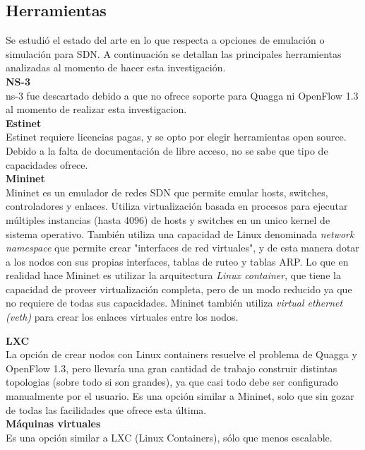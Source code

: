 \documentclass[a4paper,12pt]{report}
\begin{document}
\subsection{Herramientas}
Se estudió el estado del arte en lo que respecta a opciones de emulación o simulación para SDN. A continuación se detallan las principales herramientas analizadas al momento de hacer esta investigación.\\

\textbf{NS-3}\\
ns-3 fue descartado debido a que no ofrece soporte para Quagga ni OpenFlow 1.3 al momento de realizar esta investigacion.\\

\textbf{Estinet}\\
Estinet requiere licencias pagas, y se opto por elegir herramientas open source. Debido a la falta de documentación de libre acceso, no se sabe que tipo de capacidades ofrece.\\

\textbf{Mininet}\\
Mininet es un emulador de redes SDN que permite emular hosts, switches, controladores y enlaces. Utiliza virtualización basada en procesos para ejecutar múltiples instancias (hasta 4096) de hosts y switches en un unico kernel de sistema operativo. También utiliza una capacidad de Linux denominada \textit{network namespace} que permite crear "interfaces de red virtuales", y de esta manera dotar a los nodos con sus propias interfaces, tablas de ruteo y tablas ARP. Lo que en realidad hace Mininet es utilizar la arquitectura \textit{Linux container}, que tiene la capacidad de proveer virtualización completa, pero de un modo reducido ya que no requiere de todas sus capacidades. Mininet también utiliza \textit{virtual ethernet (veth)} para crear los enlaces virtuales entre los nodos.


\textbf{LXC}\\
La opción de crear nodos con Linux containers resuelve el problema de Quagga y OpenFlow 1.3, pero llevaría una gran cantidad de trabajo construir distintas topologias (sobre todo si son grandes), ya que casi todo debe ser configurado manualmente por el usuario. Es una opción similar a Mininet, solo que sin gozar de todas las facilidades que ofrece esta última.\\


\textbf{Máquinas virtuales}\\
Es una opción similar a LXC (Linux Containers), sólo que menos escalable.
\\
\end{document}
